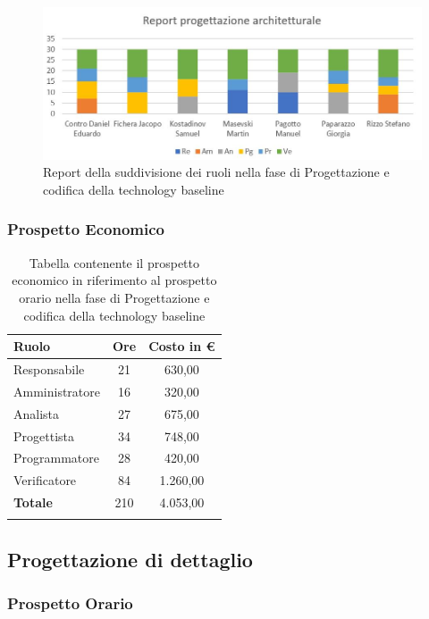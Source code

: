 \documentclass[../piano_di_progetto.tex]{subfiles}
\begin{document}
\begin{figure}[H]
\centering
\includegraphics[width=12cm]{src/img/report/report_prog_arc}
\caption{Report della suddivisione dei ruoli nella fase di Progettazione e codifica della technology baseline}
\end{figure}

\subsubsection{Prospetto Economico}

\begin{center}
	\begin{longtable}{|l|c|c|}
		\hline
		\rowcolor{lightgray}
		\textbf{Ruolo} & \textbf{Ore} & \textbf{Costo in €}\\

		\hline
		Responsabile & 21 & 630,00\\
		Amministratore & 16 & 320,00\\
		Analista & 27 & 675,00\\
		Progettista & 34 & 748,00\\
		Programmatore & 28 & 420,00\\
		Verificatore & 84 & 1.260,00\\
		\hline
		\textbf{Totale} & 210 & 4.053,00\\
		\hline
		\rowcolor{white}
		\caption{Tabella contenente il prospetto economico in riferimento al prospetto orario nella fase di Progettazione e codifica della technology baseline}
	\end{longtable}
\end{center}


\subsection{Progettazione di dettaglio}%
\label{sub:fase_prog_dett}
\subsubsection{Prospetto Orario}
\end{document}
